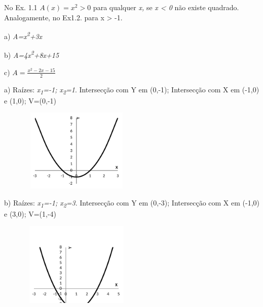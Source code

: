 \begin{enumerate}[label=\thechapter.\arabic*]
\ansitem{} No Ex. 1.1 $A(x)=x^{2} > 0$ para qualquer \textit{x,} se \textit{x < 0} não existe quadrado. Analogamente, no Ex1.2.  para  x > -1. 

\ansitem{} a) \textit{A=x\textsuperscript{2}+3x}

b) \textit{A=4x\textsuperscript{2}+8x+15}

c)  \( A=\frac{x^{2}-2x-15}{2} \) 

\ansitem{}
\begin{multicols}{2}
a) Raízes: \textit{x\textsubscript{1}=-1; x\textsubscript{2}=1}. Intersecção com Y em (0,-1); Intersecção com X em (-1,0) e (1,0); V=(0,-1)

\begin{figure}[H]
	\begin{Center}
		\includegraphics[width=2.15in,height=1.55in]{capitulos/funcao_do_segundo_grau/media/image28.pdf}
	\end{Center}
\end{figure}
\end{multicols}

\begin{multicols}{2}
b) Raízes: \textit{x\textsubscript{1}=-1; x\textsubscript{2}=3}. Intersecção com Y em (0,-3); Intersecção com X em (-1,0) e (3,0); V=(1,-4)

\begin{figure}[H]
	\begin{Center}
		\includegraphics[width=2.15in,height=1.58in]{capitulos/funcao_do_segundo_grau/media/image29.pdf}
	\end{Center}
\end{figure}
\end{multicols}


\end{enumerate}
